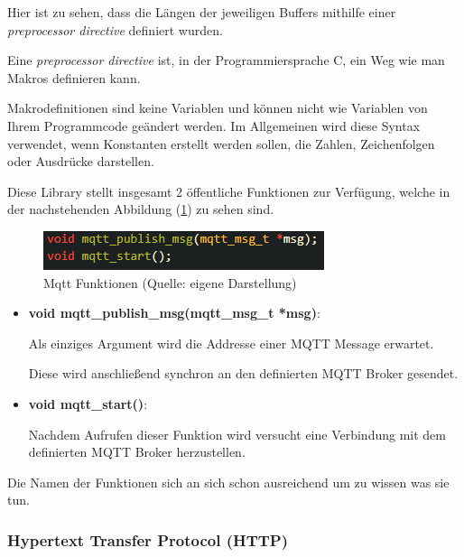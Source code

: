 Hier ist zu sehen, dass die Längen der jeweiligen Buffers mithilfe einer \textit{preprocessor directive} definiert wurden. 

Eine \textit{preprocessor directive} ist, in der Programmiersprache C, ein Weg wie man Makros definieren kann. 

Makrodefinitionen sind keine Variablen und können nicht wie Variablen von Ihrem Programmcode geändert werden. Im Allgemeinen wird diese Syntax verwendet, wenn Konstanten erstellt werden sollen, die Zahlen, Zeichenfolgen oder Ausdrücke darstellen.

Diese Library stellt insgesamt 2 öffentliche Funktionen zur Verfügung, welche in der nachstehenden Abbildung (\ref{abb:mqtt_functions}) zu sehen sind.

\begin{figure}[H]
    \begin{center}
        \includegraphics[scale=1]{images/mqtt_functions.png}
        \caption{Mqtt Funktionen (Quelle: eigene Darstellung)}
        \label{abb:mqtt_functions}
    \end{center}
\end{figure}

\begin{itemize}
    \item \textbf{void mqtt\_publish\_msg(mqtt\_msg\_t *msg)}:
    
    Als einziges Argument wird die Addresse einer MQTT Message erwartet.

    Diese wird anschließend synchron an den definierten MQTT Broker gesendet.

    \item \textbf{void mqtt\_start()}:
    
    Nachdem Aufrufen dieser Funktion wird versucht eine Verbindung mit dem definierten MQTT Broker herzustellen.

\end{itemize}

Die Namen der Funktionen sich an sich schon ausreichend um zu wissen was sie tun.

\subsubsection{Hypertext Transfer Protocol (HTTP)}\label{sec:own-libraries-http}

